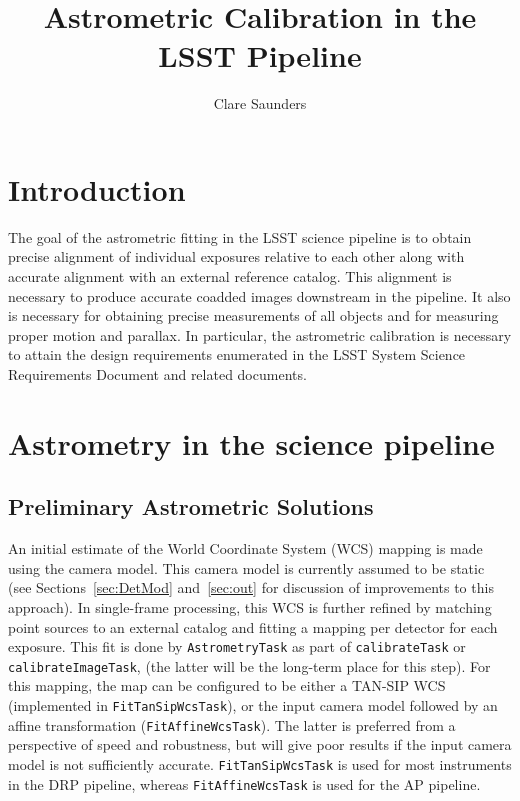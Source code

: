 \documentclass[DM,authoryear,toc]{lsstdoc}
\title{Astrometric Calibration in the LSST Pipeline}
\author{%
Clare Saunders
}
\date{\vcsDate}
\begin{document}
\maketitle

\section{Introduction}
The goal of the astrometric fitting in the LSST science pipeline  is to obtain precise alignment of individual exposures relative to each other along with accurate alignment with an external reference catalog. This alignment is necessary to produce accurate coadded images downstream in the pipeline. It also is necessary for obtaining precise measurements of all objects and for measuring proper motion and parallax. In particular, the astrometric calibration is necessary to attain the design requirements enumerated in the LSST System Science Requirements Document  and related documents.

\section{Astrometry in the science pipeline}
\subsection{Preliminary Astrometric Solutions}
An initial estimate of the World Coordinate System (WCS) mapping is made using the camera model. This camera model is currently assumed to be static (see Sections~\ref{sec:DetMod} and~\ref{sec:out} for discussion of improvements to this approach). In single-frame processing, this WCS is further refined by matching point sources to an external catalog and fitting a mapping per detector for each exposure. This fit is done by \texttt{AstrometryTask} as part of \texttt{calibrateTask} or \texttt{calibrateImageTask}, (the latter will be the long-term place for this step). For this mapping, the map can be configured to be either a TAN-SIP WCS \citep{2005ASPC..347..491S} (implemented in \texttt{FitTanSipWcsTask}), or the input camera model followed by an affine transformation (\texttt{FitAffineWcsTask}). The latter is preferred from a perspective of speed and robustness, but will give poor results if the input camera model is not sufficiently accurate. \texttt{FitTanSipWcsTask} is used for most instruments in the DRP pipeline, whereas \texttt{FitAffineWcsTask} is used for the AP pipeline.
\end{document}
